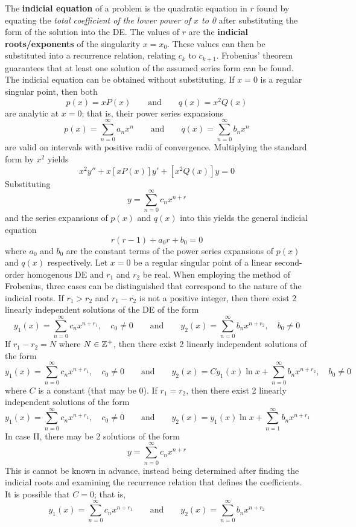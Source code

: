 \documentclass[./Differential Equations.tex]{subfiles}
\begin{document}
			The \textbf{indicial equation} of a problem is the quadratic equation in \(r\) found by equating the \textit{total coefficient of the lower power of \(x\) to 0} after substituting the form of the solution into the DE. The values of \(r\) are the \textbf{indicial roots/exponents} of the singularity \(x = x_0\). These values can then be substituted into a recurrence relation, relating \(c_k\) to \(c_{k + 1}\). Frobenius' theorem guarantees that at least one solution of the assumed series form can be found. \\
			The indicial equation can be obtained without substituting. If \(x = 0\) is a regular singular point, then both 
				\[
					p(x) = xP(x) \qquad \text{and} \qquad
					q(x) = x^2Q(x)
				\]
				are analytic at \(x = 0\); that is, their power series expansions 
					\[
						p(x) = \sum_{n = 0}^\infty a_nx^n \qquad \text{and} \qquad
						q(x) = \sum_{n = 0}^\infty b_nx^n
					\]
				are valid on intervals with positive radii of convergence. Multiplying the standard form by \(x^2\) yields
				\[x^2y'' + x[xP(x)]y' + [x^2Q(x)]y = 0\]
				Substituting
				\[y = \sum_{n = 0}^\infty c_nx^{n + r}\]
				and the series expansions of \(p(x)\) and \(q(x)\) into this yields the general indicial equation
				\[r(r - 1) + a_0r + b_0 = 0\]
				where \(a_0\) and \(b_0\) are the constant terms of the power series expansions of \(p(x)\) and \(q(x)\) respectively.
			Let \(x = 0\) be a regular singular point of a linear second-order homogenous DE and \(r_1\) and \(r_2\) be real. When employing the method of Frobenius, three cases can be distinguished that correspond to the nature of the indicial roots.
				If \(r_1 > r_2\) and \(r_1 - r_2\) is not a positive integer, then there exist 2 linearly independent solutions of the DE of the form
					\[
						y_1(x) = \sum_{n = 0}^\infty c_nx^{n + r_1}, \quad c_0 \ne 0 \qquad \text{and} \qquad
						y_2(x) = \sum_{n = 0}^\infty b_nx^{n + r_2}, \quad b_0 \ne 0
					\]
				If \(r_1 - r_2 = N\) where \(N \in \mathbb{Z}^+\), then there exist 2 linearly independent solutions of the form
					\[
						y_1(x) = \sum_{n = 0}^\infty c_nx^{n + r_1}, \quad c_0 \ne 0 \qquad \text{and} \qquad
						y_2(x) = Cy_1(x)\ln x + \sum_{n = 0}^\infty b_nx^{n + r_2}, \quad b_0 \ne 0
					\]
					where \(C\) is a constant (that may be 0).
				If \(r_1 = r_2\), then there exist 2 linearly independent solutions of the form
					\[
						y_1(x) = \sum_{n = 0}^\infty c_nx^{n + r_1}, \quad c_0 \ne 0 \qquad \text{and} \qquad
						y_2(x) = y_1(x)\ln x + \sum_{n = 1}^\infty b_nx^{n + r_1}
					\]
			In case II, there may be 2 solutions of the form
				\[y = \sum_{n = 0}^\infty c_nx^{n + r}\]
				This is cannot be known in advance, instead being determined after finding the indicial roots and examining the recurrence relation that defines the coefficients. It is possible that \(C = 0\); that is,
				\[
					y_1(x) = \sum_{n = 0}^\infty c_nx^{n + r_1} \qquad \text{and} \qquad
					y_2(x) = \sum_{n = 0}^\infty b_nx^{n + r_2}
				\]
\end{document}
